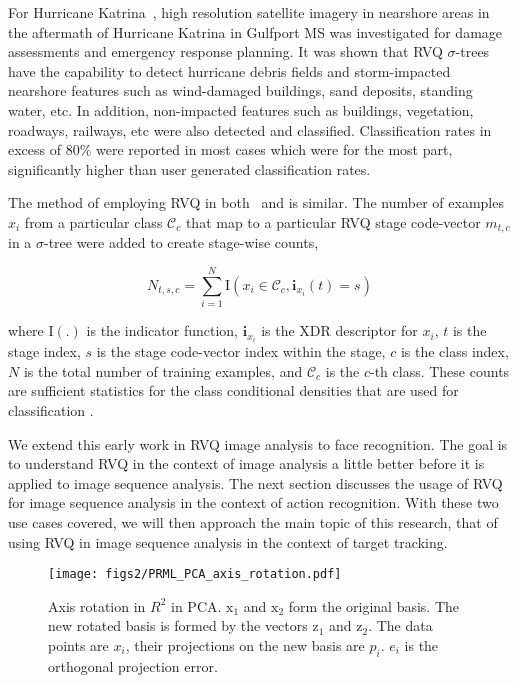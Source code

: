 \begin{Body}
For Hurricane Katrina~\cite{2007_JNL_Katrina_Barnes}, high resolution satellite imagery in nearshore areas in the aftermath of Hurricane Katrina in Gulfport MS was investigated for damage assessments and emergency response planning.  It was shown that RVQ $\sigma$-trees have the capability to detect hurricane debris fields and storm-impacted nearshore features such as wind-damaged buildings, sand deposits, standing water, etc.  In addition, non-impacted features such as buildings, vegetation, roadways, railways, etc were also detected and classified.  Classification rates in excess of 80\% were reported in most cases which were for the most part, significantly higher than user generated classification rates. 

The method of employing RVQ in both~\cite{2007_JNL_Katrina_Barnes} and \cite{2007_JNL_IDDM_Barnes} is similar.  The number of examples $x_i$ from a particular class $\mathcal{C}_c$ that map to a particular RVQ stage code-vector $m_{t,c}$ in a $\sigma$-tree were added to create stage-wise counts,

\begin{equation}
N_{t,s,c} = \sum\limits_{i=1}^N\mathrm{I}(x_i \in \mathcal{C}_c, \mathbf{i}_{x_i}(t)=s)
\end{equation}

where $\mathrm{I}(.)$ is the indicator function, $\mathbf{i}_{x_i}$ is the XDR descriptor for $x_i$, $t$ is the stage index, $s$ is the stage code-vector index within the stage, $c$ is the class index, $N$ is the total number of training examples, and $\mathcal{C}_c$ is the $c$-th class.  These counts are sufficient statistics for the class conditional densities that are used for classification \cite{1993_BOOK_SSP_Kay}.

We extend this early work in RVQ image analysis to face recognition.  The goal is to understand RVQ in the context of image analysis a little better before it is applied to image sequence analysis.  The next section discusses the usage of RVQ for image sequence analysis in the context of action recognition.  With these two use cases covered, we will then approach the main topic of this research, that of using RVQ in image sequence analysis in the context of target tracking.

\begin{figure}
\centering
\texttt{[image: figs2/PRML\_PCA\_axis\_rotation.pdf]}
\caption{Axis rotation in $R^2$ in PCA.  $\mathrm{x}_1$ and $\mathrm{x}_2$ form the original basis.  The new rotated basis is formed by the vectors $\mathrm{z}_1$ and $\mathrm{z}_2$.  The data points are $x_i$, their projections on the new basis are $p_i$.  $e_i$ is the orthogonal projection error.}
\label{fig:PCA_axis_rotation}
\end{figure}


\end{Body}
